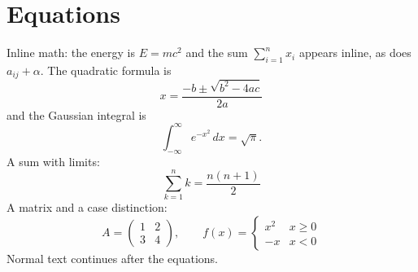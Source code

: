 \documentclass[11pt]{article}
\begin{document}
\section*{Equations}
Inline math: the energy is $E = mc^2$ and the sum $\sum_{i=1}^{n} x_i$ appears inline, as does $a_{ij} + \alpha$.
The quadratic formula is
\[ x = \frac{-b \pm \sqrt{b^2 - 4ac}}{2a} \]
and the Gaussian integral is
\[ \int_{-\infty}^{\infty} e^{-x^2}\,dx = \sqrt{\pi}. \]
A sum with limits:
\[ \sum_{k=1}^{n} k = \frac{n(n+1)}{2} \]
A matrix and a case distinction:
\[ A = \begin{pmatrix} 1 & 2 \\ 3 & 4 \end{pmatrix}, \qquad
   f(x) = \begin{cases} x^2 & x \ge 0 \\ -x & x < 0 \end{cases} \]
Normal text continues after the equations.
\end{document}

